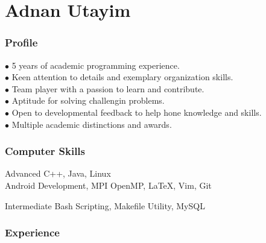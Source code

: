 \documentclass{tccv}
\begin{document}
\part{Adnan Utayim}


\section{Profile}
$\bullet$ 5 years of academic programming experience. \\
$\bullet$ Keen attention to details and exemplary organization skills.\\
$\bullet$ Team player with a passion to learn and contribute.\\
$\bullet$ Aptitude for solving challengin problems.\\
$\bullet$ Open to developmental feedback to help hone knowledge and skills. \\
$\bullet$ Multiple academic distinctions and awards.

\section{Computer Skills}

\begin{factlist}

\item{Advanced}
     {C++, Java, Linux \\Android Development, MPI OpenMP, \LaTeX, Vim, Git}


\item{Intermediate}
     {Bash Scripting, Makefile Utility, MySQL}

\end{factlist}


\section{Experience}
\end{document}
